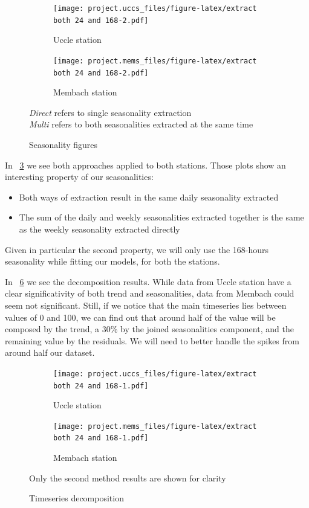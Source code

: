 \documentclass[12pt]{article}
\begin{document}
\begin{figure}[h]
	\begin{subfigure}{.5\linewidth}
		\texttt{[image: project.uccs\_files/figure-latex/extract both 24 and 168-2.pdf]}
		\caption{Uccle station}
		\label{fig:direct-multi-seasonality:uccs}
	\end{subfigure}
	\begin{subfigure}{.5\linewidth}
		\texttt{[image: project.mems\_files/figure-latex/extract both 24 and 168-2.pdf]}
		\caption{Membach station}
		\label{fig:direct-multi-seasonality:mems}
	\end{subfigure}
	\begin{center}
		\caption{Seasonality figures}{\small\textit{Direct} refers to single seasonality extraction\\\textit{Multi} refers to both seasonalities extracted at the same time}
		\label{fig:direct-multi-seasonality}
	\end{center}
\end{figure}

In \figurename~\ref{fig:direct-multi-seasonality} we see both approaches applied to both stations. Those plots show an interesting property of our seasonalities:
\begin{itemize}
	\item Both ways of extraction result in the same daily seasonality extracted
	\item The sum of the daily and weekly seasonalities extracted together is the same as the weekly seasonality extracted directly
\end{itemize}
Given in particular the second property, we will only use the 168-hours seasonality while fitting our models, for both the stations.

In \figurename~\ref{fig:decomposed} we see the decomposition results. While data from Uccle station have a clear significativity of both trend and seasonalities, data from Membach could seem not significant. Still, if we notice that the main timeseries lies between values of 0 and 100, we can find out that around half of the value will be composed by the trend, a 30\% by the joined seasonalities component, and the remaining value by the residuals. We will need to better handle the spikes from around half our dataset.

\begin{figure}[h]
	\begin{subfigure}{.5\linewidth}
		\texttt{[image: project.uccs\_files/figure-latex/extract both 24 and 168-1.pdf]}
		\caption{Uccle station}
		\label{fig:decomposed:uccs}
	\end{subfigure}
	\begin{subfigure}{.5\linewidth}
		\texttt{[image: project.mems\_files/figure-latex/extract both 24 and 168-1.pdf]}
		\caption{Membach station}
		\label{fig:decomposed:mems}
	\end{subfigure}
	\begin{center}
		\caption{Timeseries decomposition}{\small Only the second method results are shown for clarity}
		\label{fig:decomposed}
	\end{center}
\end{figure}
\end{document}
